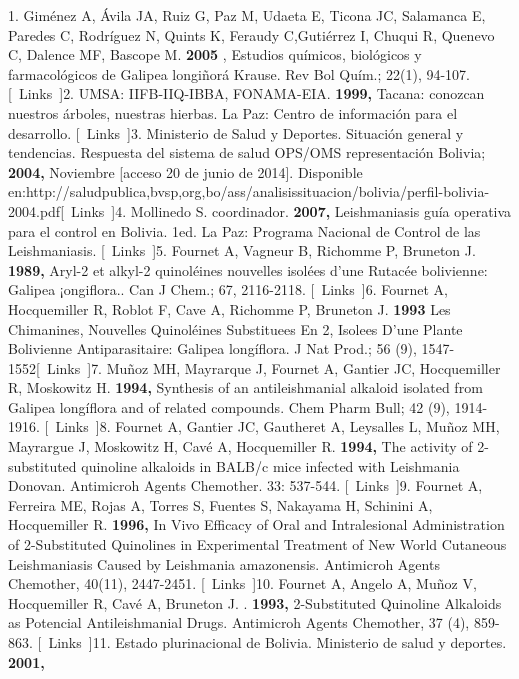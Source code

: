 \documentclass{article}
\begin{document}
{}{1. Giménez A, Ávila JA, Ruiz G, Paz M, Udaeta E, Ticona JC, Salamanca E, Paredes C, Rodríguez N, Quints K, Feraudy C,}{Gutiérrez I, Chuqui R, Quenevo C, Dalence MF, Bascope M. \textbf{2005}
, Estudios químicos, biológicos y farmacológicos de Galipea longiñorá Krause. Rev Bol Quím.; 22(1), 94-107.    [ Links ]}{2. UMSA: IIFB-IIQ-IBBA, FONAMA-EIA. \textbf{1999, }
Tacana: conozcan nuestros árboles, nuestras hierbas. La Paz: Centro de información para el desarrollo.    [ Links ]}{3. Ministerio de Salud y Deportes. Situación general y tendencias. Respuesta del sistema de salud OPS/OMS representación Bolivia; \textbf{2004, }
Noviembre [acceso 20 de junio de 2014]. Disponible }{en:}{http://saludpublica,bvsp,org,bo/ass/analisissituacion/bolivia/perfil-bolivia-2004.pdf}[ Links ]{4.  Mollinedo S. coordinador. \textbf{2007, }
Leishmaniasis guía operativa para el control en Bolivia. 1ed. La Paz: Programa Nacional de Control de las Leishmaniasis.    [ Links ]}{5.  Fournet A, Vagneur B, Richomme P, Bruneton J. \textbf{1989, }
Aryl-2 et alkyl-2 quinoléines nouvelles isolées d'une Rutacée bolivienne: Galipea ¡ongiflora.. Can J Chem.; 67, 2116-2118.    [ Links ]}{6. Fournet A, Hocquemiller R, Roblot F, Cave A, Richomme P, Bruneton J. \textbf{1993 }
Les Chimanines, Nouvelles Quinoléines Substituees En 2, Isolees D'une Plante Bolivienne Antiparasitaire: Galipea longíflora. J Nat Prod.; 56 (9), 1547-1552}[ Links ]{7. Muñoz MH, Mayrarque J, Fournet A, Gantier JC, Hocquemiller R, Moskowitz H. \textbf{1994, }
Synthesis of an antileishmanial alkaloid isolated from Galipea longíflora and of related compounds. Chem Pharm Bull; 42 (9), 1914-1916.    [ Links ]}{8. Fournet A, Gantier JC, Gautheret A, Leysalles L, Muñoz MH, Mayrargue J, Moskowitz H, Cavé A, Hocquemiller R. \textbf{1994, }
The activity of 2-substituted quinoline alkaloids in BALB/c mice infected with Leishmania Donovan. Antimicroh Agents Chemother. 33: 537-544.    [ Links ]}{9. Fournet A, Ferreira ME, Rojas A, Torres S, Fuentes S, Nakayama H, Schinini A, Hocquemiller R. \textbf{1996, }
In Vivo Efficacy of Oral and Intralesional Administration of 2-Substituted Quinolines in Experimental Treatment of New World Cutaneous Leishmaniasis Caused by Leishmania amazonensis. Antimicroh Agents Chemother, 40(11), 2447-2451.    [ Links ]}{10. Fournet A, Angelo A, Muñoz V, Hocquemiller R, Cavé A, Bruneton J. . \textbf{1993, }
2-Substituted Quinoline Alkaloids as Potencial Antileishmanial Drugs. Antimicroh Agents Chemother, 37 (4), 859-863.    [ Links ]}{11. Estado plurinacional de Bolivia. Ministerio de salud y deportes. \textbf{2001, }
}
\end{document}
